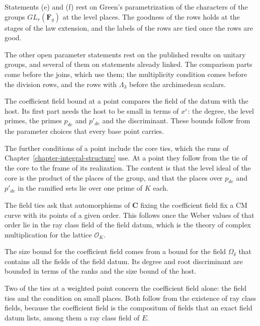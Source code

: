 Statements (e) and (f) rest on Green's parametrization of the characters of the
groups $GL_r(\mathbf F_g)$ at the level places. The goodness of the rows holds at
the stages of the law extension, and the labels of the rows are tied once the
rows are good.

The other open parameter statements rest on the published results on unitary
groups, and several of them on statements already linked. The comparison parts
come before the joins, which use them; the multiplicity condition comes before
the division rows, and the rows with $\Lambda_3$ before the archimedean scalars.

The coefficient field bound at a point compares the field of the datum with the
host. Its first part needs the host to be small in terms of $x^{\varepsilon}$:
the degree, the level primes, the primes $p_{de}$ and $p'_{de}$ and the
discriminant. These bounds follow from the parameter choices that every base
point carries.

The further conditions of a point include the core ties, which the runs of
Chapter~\ref{chapter-integral-structure} use. At a point they follow from the tie
of the core to the frame of its realization. The content is that the level ideal
of the core is the product of the places of the group, and that the places over
$p_{de}$ and $p'_{de}$ in the ramified sets lie over one prime of $K$ each.

The field ties ask that automorphisms of $\mathbf C$ fixing the coefficient field fix a CM curve with its points of
a given order. This follows once the Weber values of that order lie in the ray class field of the field datum, which
is the theory of complex multiplication for the lattice $\mathcal O_K$.

The size bound for the coefficient field comes from a bound for the field $\Omega_\delta$ that contains all the
fields of the field datum. Its degree and root discriminant are bounded in terms of the ranks and the size bound of
the host.

Two of the ties at a weighted point concern the coefficient field alone: the
field ties and the condition on small places. Both follow from the existence of
ray class fields, because the coefficient field is the compositum of fields that
an exact field datum lists, among them a ray class field of $E$.


